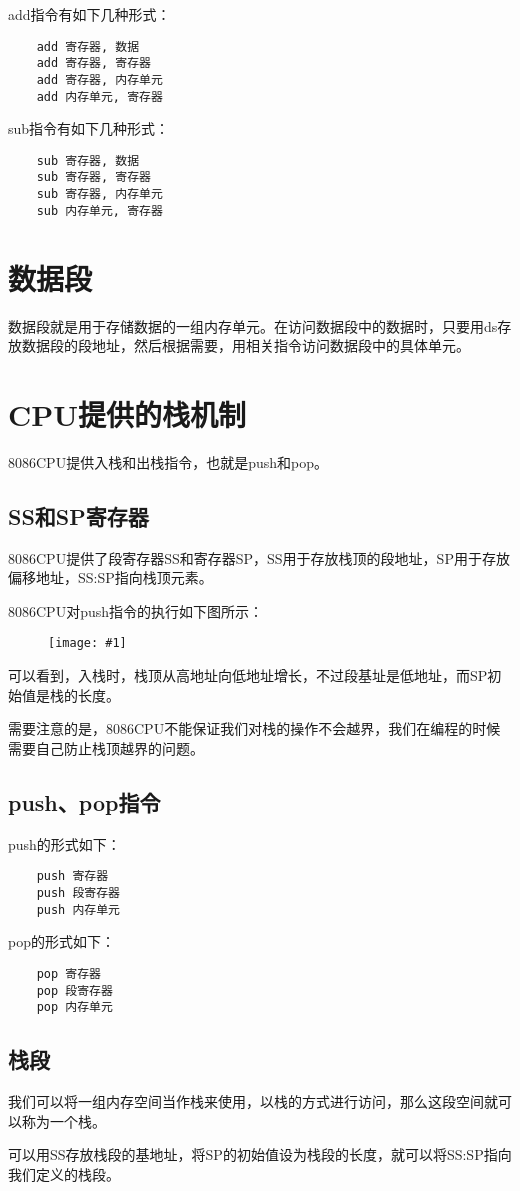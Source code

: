 \documentclass[a4paper,left=2.5cm,right=2.5cm,11pt]{article}
\newcommand{\fic}[1]{\begin{figure}[H]
		\center
		\texttt{[image: \#1]}
	\end{figure}}
\begin{document}
	add指令有如下几种形式：
	\begin{lstlisting}
	add 寄存器, 数据
	add 寄存器, 寄存器
	add 寄存器, 内存单元
	add 内存单元, 寄存器
	\end{lstlisting}

	sub指令有如下几种形式：
	\begin{lstlisting}
	sub 寄存器, 数据
	sub 寄存器, 寄存器
	sub 寄存器, 内存单元
	sub 内存单元, 寄存器
	\end{lstlisting}

\section{数据段}
	数据段就是用于存储数据的一组内存单元。在访问数据段中的数据时，只要用ds存放数据段的段地址，然后根据需要，用相关指令访问数据段中的具体单元。

\section{CPU提供的栈机制}
	8086CPU提供入栈和出栈指令，也就是push和pop。\par

\subsection{SS和SP寄存器}

	8086CPU提供了段寄存器SS和寄存器SP，SS用于存放栈顶的段地址，SP用于存放偏移地址，SS:SP指向栈顶元素。\par

	8086CPU对push指令的执行如下图所示：
	\fic{1.png}

	可以看到，入栈时，栈顶从高地址向低地址增长，不过段基址是低地址，而SP初始值是栈的长度。\par

	需要注意的是，8086CPU不能保证我们对栈的操作不会越界，我们在编程的时候需要自己防止栈顶越界的问题。

\subsection{push、pop指令}
	push的形式如下：
	\begin{lstlisting}
	push 寄存器
	push 段寄存器
	push 内存单元
	\end{lstlisting}

	pop的形式如下：
	\begin{lstlisting}
	pop 寄存器
	pop 段寄存器
	pop 内存单元
	\end{lstlisting}

\subsection{栈段}
	我们可以将一组内存空间当作栈来使用，以栈的方式进行访问，那么这段空间就可以称为一个栈。\par

	可以用SS存放栈段的基地址，将SP的初始值设为栈段的长度，就可以将SS:SP指向我们定义的栈段。
\end{document}
